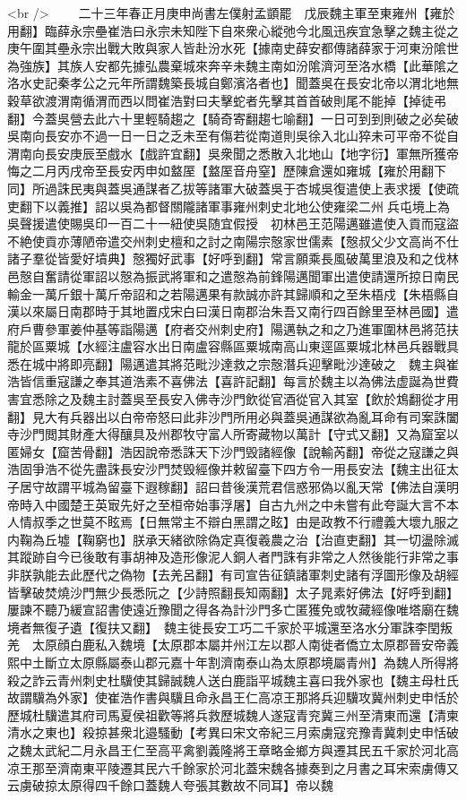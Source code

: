 <br />
　　二十三年春正月庚申尚書左僕射孟顗罷　戊辰魏主軍至東雍州【雍於用翻】臨薛永宗壘崔浩曰永宗未知陛下自來衆心縱弛今北風迅疾宜急擊之魏主從之庚午圍其壘永宗出戰大敗與家人皆赴汾水死【據南史薛安都傳諸薛家于河東汾隂世為強族】其族人安都先據弘農棄城來奔辛未魏主南如汾隂濟河至洛水橋【此華隂之洛水史記秦孝公之元年所謂魏築長城自鄭濱洛者也】聞蓋吳在長安北帝以渭北地無穀草欲渡渭南循渭而西以問崔浩對曰夫擊蛇者先擊其首首破則尾不能掉【掉徒弔翻】今蓋吳營去此六十里輕騎趨之【騎奇寄翻趨七喻翻】一日可到到則破之必矣破吳南向長安亦不過一日一日之乏未至有傷若從南道則吳徐入北山猝未可平帝不從自渭南向長安庚辰至戲水【戲許宜翻】吳衆聞之悉散入北地山【地字衍】軍無所獲帝悔之二月丙戌帝至長安丙申如盩厔【盩厔音舟窒】歷陳倉還如雍城【雍於用翻下同】所過誅民夷與蓋吳通謀者乙拔等諸軍大破蓋吳于杏城吳復遣使上表求援【使疏吏翻下以義推】詔以吳為都督關隴諸軍事雍州刺史北地公使雍梁二州兵屯境上為吳聲援遣使賜吳印一百二十一紐使吳随宜假授　初林邑王范陽邁雖遣使入貢而寇盜不絶使貢亦薄陋帝遣交州刺史檀和之討之南陽宗慤家世儒素【慤叔父少文高尚不仕諸子羣從皆愛好墳典】慤獨好武事【好呼到翻】常言願乘長風破萬里浪及和之伐林邑慤自奮請從軍詔以慤為振武將軍和之遣慤為前鋒陽邁聞軍出遣使請還所掠日南民輸金一萬斤銀十萬斤帝詔和之若陽邁果有款誠亦許其歸順和之至朱梧戍【朱梧縣自漢以來屬日南郡時于其地置戍宋白曰漢日南郡治朱吾又南行四百餘里至林邑國】遣府戶曹參軍姜仲基等詣陽邁【府者交州刺史府】陽邁執之和之乃進軍圍林邑將范扶龍於區粟城【水經注盧容水出日南盧容縣區粟城南高山東逕區粟城北林邑兵器戰具悉在城中將即亮翻】陽邁遣其將范毗沙達救之宗慤潛兵迎擊毗沙達破之　魏主與崔浩皆信重寇謙之奉其道浩素不喜佛法【喜許記翻】每言於魏主以為佛法虚誕為世費害宜悉除之及魏主討蓋吳至長安入佛寺沙門飲從官酒從官入其室【飲於鴆翻從才用翻】見大有兵器出以白帝帝怒曰此非沙門所用必與蓋吳通謀欲為亂耳命有司案誅闔寺沙門閲其財產大得釀具及州郡牧守富人所寄藏物以萬計【守式又翻】又為窟室以匿婦女【窟苦骨翻】浩因說帝悉誅天下沙門毁諸經像【說輸芮翻】帝從之寇謙之與浩固爭浩不從先盡誅長安沙門焚毁經像并敕留臺下四方令一用長安法【魏主出征太子居守故謂平城為留臺下遐稼翻】詔曰昔後漢荒君信惑邪偽以亂天常【佛法自漢明帝時入中國楚王英㝡先好之至桓帝始事浮屠】自古九州之中未嘗有此夸誕大言不本人情叔季之世莫不眩焉【日無常主不辯白黑謂之眩】由是政教不行禮義大壞九服之内鞠為丘墟【鞠窮也】朕承天緒欲除偽定真復羲農之治【治直吏翻】其一切盪除滅其蹤跡自今已後敢有事胡神及造形像泥人銅人者門誅有非常之人然後能行非常之事非朕孰能去此歷代之偽物【去羌呂翻】有司宣告征鎮諸軍刺史諸有浮圖形像及胡經皆擊破焚燒沙門無少長悉阮之【少詩照翻長知兩翻】太子晁素好佛法【好呼到翻】屢諫不聽乃緩宣詔書使遠近豫聞之得各為計沙門多亡匿獲免或牧藏經像唯塔廟在魏境者無復孑遺【復扶又翻】　魏主徙長安工巧二千家於平城還至洛水分軍誅李閏叛羌　太原顔白鹿私入魏境【太原郡本屬并州江左以郡人南徙者僑立太原郡晉安帝義熙中土斷立太原縣屬泰山郡元嘉十年割濟南泰山為太原郡境屬青州】為魏人所得將殺之詐云青州刺史杜驥使其歸誠魏人送白鹿詣平城魏主喜曰我外家也【魏主母杜氏故謂驥為外家】使崔浩作書與驥且命永昌王仁高凉王那將兵迎驥攻冀州刺史申恬於歷城杜驥遣其府司馬夏侯祖歡等將兵救歷城魏人遂寇青兖冀三州至清東而還【清柬清水之東也】殺掠甚衆北邉騷動【考異曰宋文帝紀三月索虜寇兖豫青冀刺史申恬破之魏太武紀二月永昌王仁至高平禽劉義隆將王章略金鄉方與遷其民五千家於河北高凉王那至濟南東平陵遷其民六千餘家於河北蓋宋魏各據奏到之月書之耳宋索虜傳又云虜破掠太原得四千餘口蓋魏人夸張其數故不同耳】帝以魏